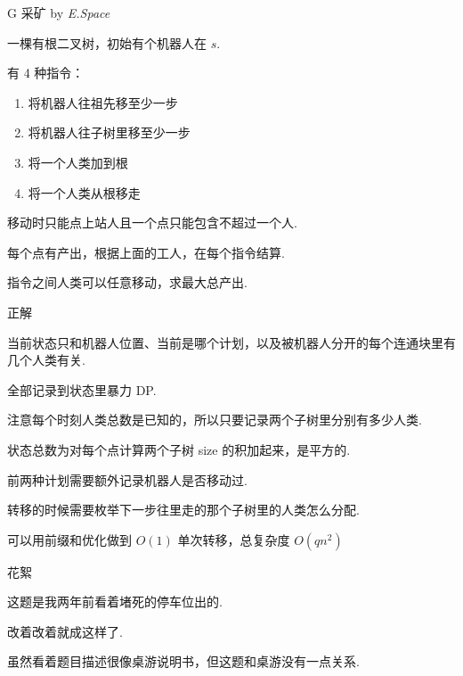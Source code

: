 \begin{frame}{G 采矿 {by \itshape E.Space}}

	一棵有根二叉树，初始有个机器人在 $s$.

	有 4 种指令：

    \begin{enumerate}
	\item 将机器人往祖先移至少一步
	\item 将机器人往子树里移至少一步
	\item 将一个人类加到根
	\item 将一个人类从根移走
	\end{enumerate}
	移动时只能点上站人且一个点只能包含不超过一个人.

	每个点有产出，根据上面的工人，在每个指令结算.

	指令之间人类可以任意移动，求最大总产出.


\end{frame}

\begin{frame}{正解}

	当前状态只和机器人位置、当前是哪个计划，以及被机器人分开的每个连通块里有几个人类有关. \pause

	全部记录到状态里暴力 DP. \pause

	注意每个时刻人类总数是已知的，所以只要记录两个子树里分别有多少人类. \pause

	状态总数为对每个点计算两个子树 size 的积加起来，是平方的. \pause

	前两种计划需要额外记录机器人是否移动过. \pause

	转移的时候需要枚举下一步往里走的那个子树里的人类怎么分配. \pause

	可以用前缀和优化做到 $O(1)$ 单次转移，总复杂度 $O(qn^2)$

\end{frame}

\begin{frame}{花絮}

	这题是我两年前看着堵死的停车位出的.

	改着改着就成这样了.

	虽然看着题目描述很像桌游说明书，但这题和桌游没有一点关系.

\end{frame}